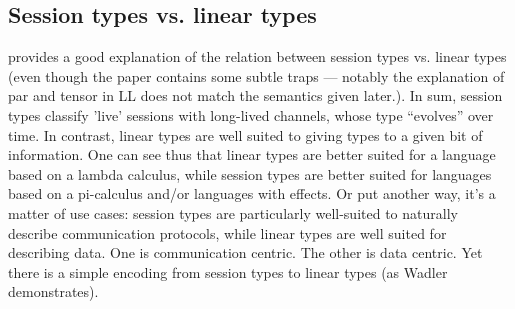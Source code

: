 \documentclass[11pt]{article}
\begin{document}
\subsection{Session types vs. linear types}

\Textcite{wadler_propositions_2012} provides a good explanation of
the relation between session types vs. linear types (even though the
paper contains some subtle traps --- notably the explanation of par
and tensor in LL does not match the semantics given later.). In sum,
session types classify 'live' sessions with long-lived channels, whose
type ``evolves'' over time. In contrast, linear types are well suited
to giving types to a given bit of information. One can see thus that
linear types are better suited for a language based on a lambda
calculus, while session types are better suited for languages based on
a pi-calculus and/or languages with effects. Or put another way,
it's a matter of use cases: session types are particularly well-suited
to naturally describe communication protocols, while linear types are
well suited for describing data. One is communication centric. The
other is data centric. Yet there is a simple
encoding from session types to linear types (as Wadler demonstrates).

\printbibliography
\end{document}
